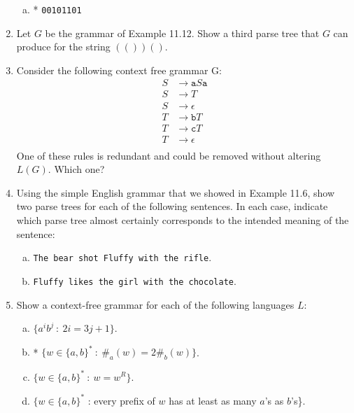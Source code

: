 \documentclass[10pt]{article}
\begin{document}
\begin{enumerate}[1)]
\begin{enumerate}[a)]
\item
* \texttt{00101101}
\end{enumerate}


\item
Let $G$ be the grammar of Example 11.12.  Show a third parse tree that $G$ can produce for the string $(())()$.


\item
Consider the following context free grammar G:
\begin{align*}
S &\rightarrow \texttt{a}S\texttt{a}\\
S &\rightarrow T\\
S &\rightarrow \epsilon\\
T &\rightarrow \texttt{b}T\\
T &\rightarrow \texttt{c}T\\
T &\rightarrow \epsilon\\
\end{align*}
One of these rules is redundant and could be removed without altering $L(G)$.  Which one?



\item
Using the simple English grammar that we showed in Example 11.6, show two parse trees for each of the following sentences.  In each case, indicate which parse tree almost certainly corresponds to the intended meaning of the sentence:
\begin{enumerate}[a)]
\item
\texttt{The bear shot Fluffy with the rifle}.

\item
\texttt{Fluffy likes the girl with the chocolate}.
\end{enumerate}


\item
Show a context-free grammar for each of the following languages $L$:
\begin{enumerate}[a)]
\item
$\{a^ib^j\ :\ 2i = 3j + 1\}$.

\item
* $\{w \in \{a, b\}^*\ :\ \#_a(w) = 2 \#_b(w)\}$.

\item
$\{w \in \{a, b\}^*\ :\ w = w^R\}$.

\item
$\{w \in \{a, b\}^*$ : every prefix of $w$ has at least as many $a$’s as $b$’s\}.


\end{enumerate}
\end{enumerate}
\end{document}
